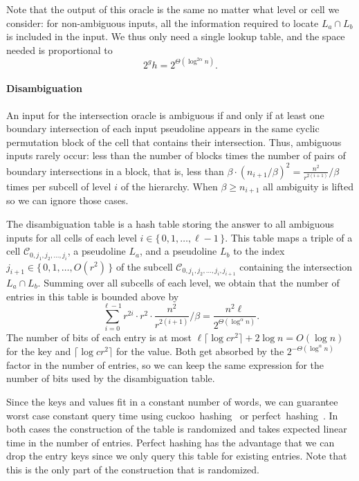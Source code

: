 Note that the output of this oracle is the same no matter what level or cell we
consider: for non-ambiguous inputs, all the information required to locate
\(L_a \cap L_b\) is included in the input.
We thus only need a single lookup table, and the space needed is proportional to
\begin{displaymath}
  2^g h
  =
  2^{\Theta(\log^{2\alpha} n)}.
\end{displaymath}

\paragraph*{Disambiguation}
An input for the intersection oracle is ambiguous if and only if at least one
boundary intersection of each input pseudoline appears in the same cyclic
permutation block of the cell that contains their intersection.
%
Thus, ambiguous inputs rarely occur:
%
less than the number of blocks times the number of pairs of boundary
intersections in a block,
%
that is, less than
\(
\beta \cdot {({n_{i+1}} / \beta)}^2
=
\frac{n^2}{r^{2(i+1)}} / \beta
\)
times per subcell of level \(i\) of the hierarchy.
%
When \(\beta \geq n_{i+1}\) all ambiguity is lifted so we can ignore
those cases.

The disambiguation table is a hash table storing the answer to all ambiguous
inputs for all cells of each level \(i \in \{\, 0,1, \ldots, \ell -1\,\}\).
%
This table maps a triple of a cell
\(\mathcal{C}_{0,j_1,j_2,\ldots,j_i}\),
a pseudoline \(L_a\),
and a pseudoline \(L_b\) to the index \( j_{i+1} \in \{\, 0,1, \ldots, O(r^2)\,\}\) of
the subcell \(\mathcal{C}_{0,j_1,j_2,\ldots,j_i,j_{i+1}}\) containing the
intersection \(L_a \cap L_b\).
%
Summing over all subcells of each level, we obtain that the
number of entries in this table is bounded above by
\begin{displaymath}
  \sum_{i=0}^{\ell - 1}  r^{2i} \cdot r^2 \cdot \frac{n^2}{r^{2(i+1)}} / \beta
  =
  \frac{n^2 \ell}{2^{\Theta(\log^{\alpha} n)}}.
\end{displaymath}
%
The number of bits of each entry is at most \(\ell \lceil \log cr^2 \rceil + 2 \log n =
O(\log n)\) for the key and
\(\lceil \log cr^2 \rceil\) for the value. Both get absorbed by the
\(2^{-\Theta(\log^{\alpha} n)}\) factor in the number of entries, so we can
keep the same expression for the number of bits used by the disambiguation table.

Since the keys and values fit in a constant number of words,
we can guarantee worst case constant query time using
cuckoo~hashing~\cite{PR04} or
perfect~hashing~\cite{FKS84}.
%
In both cases the construction of the table is randomized
and takes expected linear time in the number of entries.
Perfect hashing has the advantage that we can drop the entry keys since we
only query this table for existing entries.
Note that this is the only part of the construction that is randomized.

